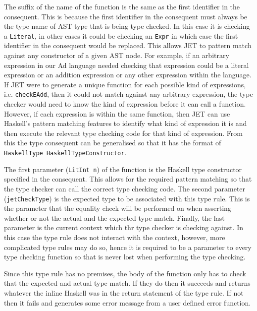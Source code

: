 The suffix of the name of the function is the same as the first identifier in the consequent.
This is because the first identifier in the consequent must always be the type name of AST type that is being type checked.
In this case it is checking a \texttt{Literal}, in other cases it could be checking an \texttt{Expr} in which case the first identifier in the consequent would be replaced.
This allows JET to pattern match against any constructor of a given AST node. 
For example, if an arbitrary expression in our Ad language needed checking that expression could be a literal expression or an addition expression or any other expression within the language.
If JET were to generate a unique function for each possible kind of expressions, i.e. \texttt{checkEAdd}, then it could not match against any arbitrary expression, the type checker would need to know the kind of expression before it can call a function.
However, if each expression is within the same function, then JET can use Haskell's pattern matching features to identify what kind of expression it is and then execute the relevant type checking code for that kind of expression.
From this the type consequent can be generalised so that it has the format of \texttt{HaskellType HaskellTypeConstructor}.

The first parameter (\texttt{LitInt n}) of the function is the Haskell type constructor specified in the consequent.
This allows for the required pattern matching so that the type checker can call the correct type checking code.
The second parameter (\texttt{jetCheckType}) is the expected type to be associated with this type rule.
This is the parameter that the equality check will be performed on when asserting whether or not the actual and the expected type match.
Finally, the last parameter is the current context which thr type checker is checking against.
In this case the type rule does not interact with the context, however, more complicated type rules may do so, hence it is required to be a parameter to every type checking function so that is never lost when performing the type checking.

Since this type rule has no premises, the body of the function only has to check that the expected and actual type match.
If they do then it succeeds and returns whatever the inline Haskell was in the return statement of the type rule.
If not then it fails and generates some error message from a user defined error function.

